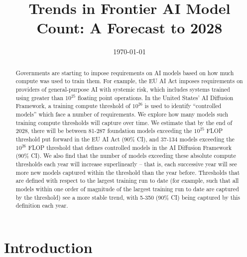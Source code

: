 \documentclass[11pt]{article}
\title{Trends in Frontier AI Model Count: A Forecast to 2028}
\date{\today}
\begin{document}
\maketitle

\begin{abstract}
Governments are starting to impose requirements on AI models based on how much compute was used to train them. For example, the EU AI Act imposes requirements on providers of general-purpose AI with systemic risk, which includes systems trained using greater than $10^{25}$ floating point operations. In the United States' AI Diffusion Framework, a training compute threshold of $10^{26}$ is used to identify ``controlled models'' which face a number of requirements. We explore how many models such training compute thresholds will capture over time. We estimate that by the end of 2028, there will be between 81-287 foundation models exceeding the $10^{25}$ FLOP threshold put forward in the EU AI Act (90\% CI), and 37-134 models exceeding the $10^{26}$ FLOP threshold that defines controlled models in the AI Diffusion Framework (90\% CI). We also find that the number of models exceeding these absolute compute thresholds each year will increase superlinearly -- that is, each successive year will see more new models captured within the threshold than the year before. Thresholds that are defined with respect to the largest training run to date (for example, such that all models within one order of magnitude of the largest training run to date are captured by the threshold) see a more stable trend, with 5-350 (90\% CI) being captured by this definition each year.
\end{abstract}

\section{Introduction}
\end{document}
